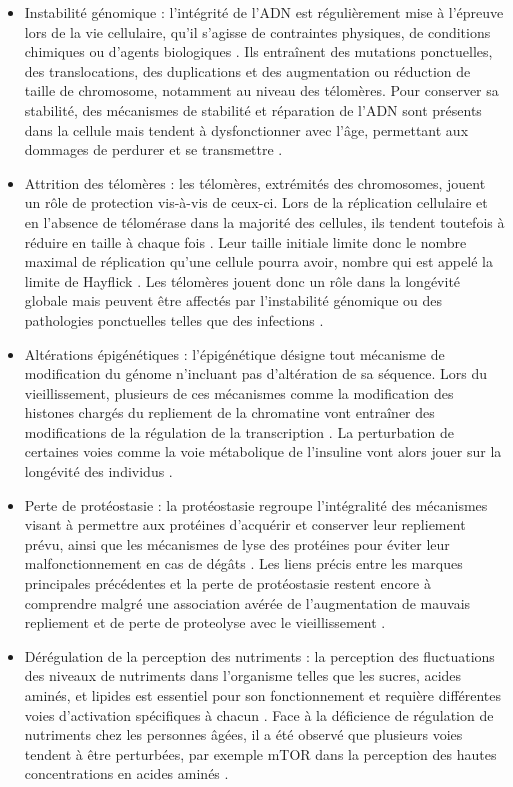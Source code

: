 \begin{itemize}
    \item Instabilité génomique : l'intégrité de l'ADN est régulièrement mise à l'épreuve lors de la vie cellulaire, qu'il s'agisse de contraintes physiques, de conditions chimiques ou d'agents biologiques \cite{Moskalev2013Mar}. Ils entraînent des mutations ponctuelles, des translocations, des duplications et des augmentation ou réduction de taille de chromosome, notamment au niveau des télomères. Pour conserver sa stabilité, des mécanismes de stabilité et réparation de l'ADN sont présents dans la cellule mais tendent à dysfonctionner avec l'âge, permettant aux dommages de perdurer et se transmettre \cite{Lord2012Jan}. 
    \item Attrition des télomères : les télomères, extrémités des chromosomes, jouent un rôle de protection vis-à-vis de ceux-ci. Lors de la réplication cellulaire et en l'absence de télomérase dans la majorité des cellules, ils tendent toutefois à réduire en taille à chaque fois \cite{Lopez-Otin2013}. Leur taille initiale limite donc le nombre maximal de réplication qu'une cellule pourra avoir, nombre qui est appelé la limite de Hayflick \cite{Hayflick1961Dec}. Les télomères jouent donc un rôle dans la longévité globale mais peuvent être affectés par l'instabilité génomique ou des pathologies ponctuelles telles que des infections \cite{Ilmonen2008May}.
    \item Altérations épigénétiques : l'épigénétique désigne tout mécanisme de modification du génome n'incluant pas d'altération de sa séquence. Lors du vieillissement, plusieurs de ces mécanismes comme la modification des histones chargés du repliement de la chromatine vont entraîner des modifications de la régulation de la transcription \cite{Fraga2007Aug}. La perturbation de certaines voies comme la voie métabolique de l'insuline vont alors jouer sur la longévité des individus \cite{Jin2011Aug}.
    \item Perte de protéostasie : la protéostasie regroupe l'intégralité des mécanismes visant à permettre aux protéines d'acquérir et conserver leur repliement prévu, ainsi que les mécanismes de lyse des protéines pour éviter leur malfonctionnement en cas de dégâts \cite{Koga2011Apr}. Les liens précis entre les marques principales précédentes et la perte de protéostasie restent encore à comprendre malgré une association avérée de l'augmentation de mauvais repliement et de perte de proteolyse avec le vieillissement \cite{Koga2011Apr}.
    \item Dérégulation de la perception des nutriments : la perception des fluctuations des niveaux de nutriments dans l'organisme telles que les sucres, acides aminés, et lipides est essentiel pour son fonctionnement et requière différentes voies d'activation spécifiques à chacun \cite{Houtkooper2010Jul}. Face à la déficience de régulation de nutriments chez les personnes âgées, il a été observé que plusieurs voies tendent à être perturbées, par exemple mTOR dans la perception des hautes concentrations en acides aminés \cite{Laplante2012Apr}.

\end{itemize}
